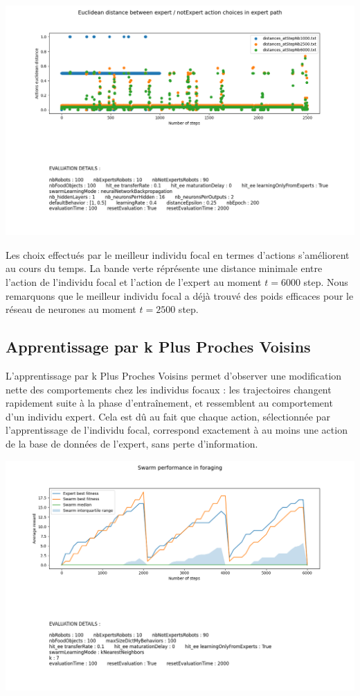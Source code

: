 \documentclass[a4paper, 12pt]{report}
\begin{document}
    \includegraphics[scale=0.5]{distances_bp.png}

    Les choix effectués par le meilleur individu focal en termes d'actions s'améliorent au cours du temps. La bande verte réprésente une distance minimale entre l'action de l'individu focal et l'action de l'expert au moment $t = 6000$ step.
    Nous remarquons que le meilleur individu focal a déjà trouvé des poids efficaces pour le réseau de neurones au moment $t = 2500$ step. 





    \subsection{Apprentissage par k Plus Proches Voisins}
    L'apprentissage par k Plus Proches Voisins permet d'observer une modification nette des comportements chez les individus focaux : les trajectoires changent rapidement suite à la phase d'entraînement, et ressemblent au comportement d'un individu expert. Cela est dû au fait que chaque action, sélectionnée par l'apprentissage de l'individu focal, correspond exactement à au moins une action de la base de données de l'expert, sans perte d'information.
    
    
    \includegraphics[scale=0.5]{knn6000_100.png}
    
\end{document}
